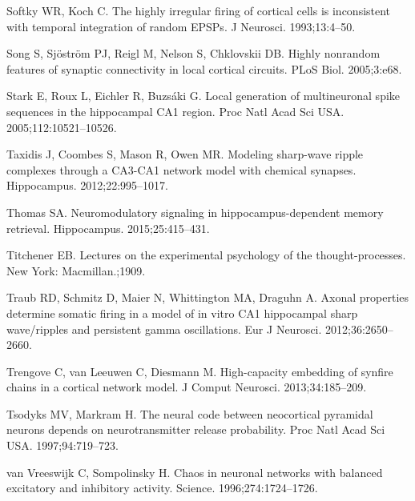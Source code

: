 \begin{thebibliography}{}
Softky WR, Koch C.
\newblock The highly irregular firing of cortical cells is inconsistent with temporal integration of random EPSPs.
\newblock J Neurosci. 1993;13:4--50.

Song S, Sj\"{o}str\"{o}m PJ, Reigl M, Nelson S, Chklovskii DB.
\newblock Highly nonrandom features of synaptic connectivity in local cortical
  circuits.
\newblock PLoS Biol. 2005;3:e68.

Stark E, Roux L, Eichler R, Buzs\'{a}ki G.
\newblock Local generation of multineuronal spike sequences in
the hippocampal CA1 region.
\newblock Proc Natl Acad Sci USA. 2005;112:10521--10526.

Taxidis J, Coombes S, Mason R, Owen MR.
\newblock Modeling sharp-wave ripple complexes through a CA3-CA1 network model with chemical synapses.
\newblock Hippocampus. 2012;22:995--1017.

Thomas SA.
\newblock Neuromodulatory signaling in hippocampus-dependent memory retrieval.
\newblock Hippocampus. 2015;25:415--431.

Titchener EB.
\newblock Lectures on the experimental psychology of the
  thought-processes.
\newblock New York: Macmillan.;1909.

Traub RD, Schmitz D, Maier N, Whittington MA, Draguhn A. 
\newblock Axonal properties determine somatic firing in a model of in vitro CA1 hippocampal sharp wave/ripples and persistent gamma oscillations.
\newblock Eur J Neurosci. 2012;36:2650--2660.

Trengove C, van Leeuwen C, Diesmann M.
\newblock High-capacity embedding of synfire chains in a cortical network
  model.
\newblock J Comput Neurosci. 2013;34:185--209.


Tsodyks MV, Markram H.
\newblock The neural code between neocortical pyramidal neurons depends on neurotransmitter release probability.
\newblock Proc Natl Acad Sci USA. 1997;94:719--723.

van Vreeswijk C, Sompolinsky H.
\newblock Chaos in neuronal networks with balanced excitatory and inhibitory
  activity.
\newblock Science. 1996;274:1724--1726.


\end{thebibliography}
